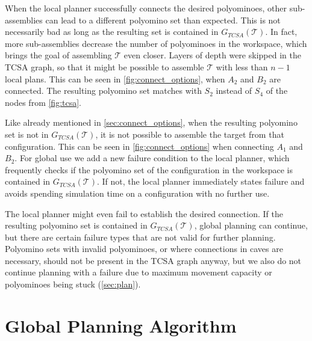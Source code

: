 When the local planner successfully connects the desired polyominoes, other sub-assemblies can lead to a different polyomino set than expected.
This is not necessarily bad as long as the resulting set is contained in $G_{\textit{TCSA}}(\mathcal{T})$.
In fact, more sub-assemblies decrease the number of polyominoes in the workspace, which brings the goal of assembling $\mathcal{T}$ even closer.
Layers of depth were skipped in the TCSA graph, so that it might be possible to assemble $\mathcal{T}$ with less than $n-1$ local plans.
This can be seen in \autoref{fig:connect_options}, when $A_2$ and $B_2$ are connected. 
The resulting polyomino set matches with $S_2$ instead of $S_4$ of the nodes from \autoref{fig:tcsa}.

Like already mentioned in \autoref{sec:connect_options}, when the resulting polyomino set is not in $G_{\textit{TCSA}}(\mathcal{T})$, it is not possible to assemble the target from that configuration.
This can be seen in \autoref{fig:connect_options} when connecting $A_1$ and $B_2$.
For global use we add a new failure condition to the local planner, which frequently checks if the polyomino set of the configuration in the workspace is contained in $G_{\textit{TCSA}}(\mathcal{T})$.
If not, the local planner immediately states failure and avoids spending simulation time on a configuration with no further use.

The local planner might even fail to establish the desired connection.
If the resulting polyomino set is contained in $G_{\textit{TCSA}}(\mathcal{T})$, global planning can continue, but there are certain failure types that are not valid for further planning.
Polyomino sets with invalid polyominoes, or where connections in caves are necessary, should not be present in the TCSA graph anyway, but we also do not continue planning with a failure due to maximum movement capacity or polyominoes being stuck (\autoref{sec:plan}).

\section{Global Planning Algorithm}
\label{sec:global_algo}

